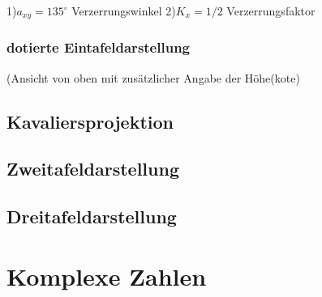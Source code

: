 \documentclass[12pt,a4paper]{scrbook}
\begin{document}
1)$a_{xy} = 135^{\circ}$ Verzerrungswinkel
2)$K_{x} = 1/2$ Verzerrungsfaktor

\subsection{dotierte Eintafeldarstellung}
(Ansicht von oben mit zusätzlicher Angabe der Höhe(kote)
\begin{figure}

\end{figure}

\section{Kavaliersprojektion}
\section{Zweitafeldarstellung}
\section{Dreitafeldarstellung}


\chapter{Komplexe Zahlen}
\end{document}
